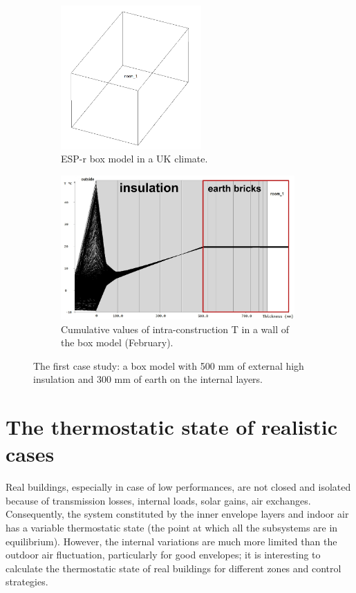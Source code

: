 \documentclass[10pt]{extarticle} %
\begin{document}
 
\begin{figure}[h]

\begin{subfigure}{0.35\textwidth}
\includegraphics[width=0.95\linewidth, height=5.5cm]{images/Dead02_boxModel.png} 
\caption{ESP-r box model in a UK climate.}
\label{fig:esprmodel}
\end{subfigure}
\begin{subfigure}{0.65\textwidth}
\includegraphics[width=0.95\linewidth, height=5.5cm]{images/01Feb_28Feb_Wall1_dead02_krita.jpg}
\caption{Cumulative values of intra-construction T in a wall of the box model (February).}
\label{fig:constructionelements}
\end{subfigure}

\caption{The first case study: a box model with 500 mm of external high  insulation and 300 mm of earth on the internal layers.}
\label{fig:casestudy}
\end{figure}





\section{The thermostatic state of realistic cases} \label{subsec:moreComplex}

Real buildings, especially in case of low performances, are not closed and isolated because of transmission losses, internal loads, solar gains, air exchanges. Consequently, the system constituted by the inner envelope layers and indoor air has a variable thermostatic state (the point at which all the subsystems are in equilibrium). However, the internal variations are much more limited than the outdoor air fluctuation, particularly for good envelopes; it is interesting to calculate the thermostatic state of real buildings for different zones and control strategies. 
\end{document}

